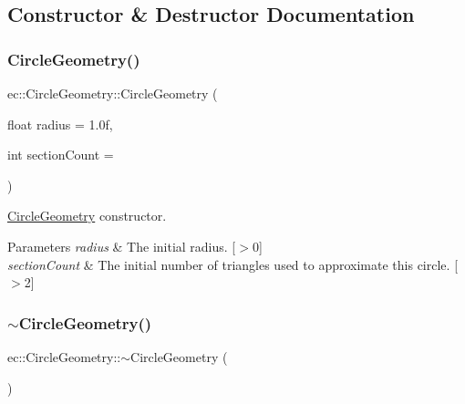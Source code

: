 \subsection{Constructor \& Destructor Documentation}
\mbox{\label{classec_1_1_circle_geometry_addbe5d69b86093eb1002638e24f2de18}} 
\subsubsection{\texorpdfstring{Circle\+Geometry()}{CircleGeometry()}}
{\footnotesize\ttfamily ec\+::\+Circle\+Geometry\+::\+Circle\+Geometry (\begin{DoxyParamCaption}\item[{float}]{radius = {\ttfamily 1.0f},  }\item[{int}]{section\+Count = {} }\end{DoxyParamCaption})\hspace{0.3cm}{\ttfamily [explicit]}}



\mbox{\hyperlink{classec_1_1_circle_geometry}{Circle\+Geometry}} constructor. 


\begin{DoxyParams}{Parameters}
{\em radius} & The initial radius. \mbox{[}$>$0\mbox{]} \\
\hline
{\em section\+Count} & The initial number of triangles used to approximate this circle. \mbox{[}$>$2\mbox{]} \\
\hline
\end{DoxyParams}
\mbox{\label{classec_1_1_circle_geometry_a1cba969c53a5379e281c720883d932e7}} 
\subsubsection{\texorpdfstring{$\sim$\+Circle\+Geometry()}{~CircleGeometry()}}
{\footnotesize\ttfamily ec\+::\+Circle\+Geometry\+::$\sim$\+Circle\+Geometry (\begin{DoxyParamCaption}{ }\end{DoxyParamCaption})\hspace{0.3cm}{\ttfamily [default]}}



